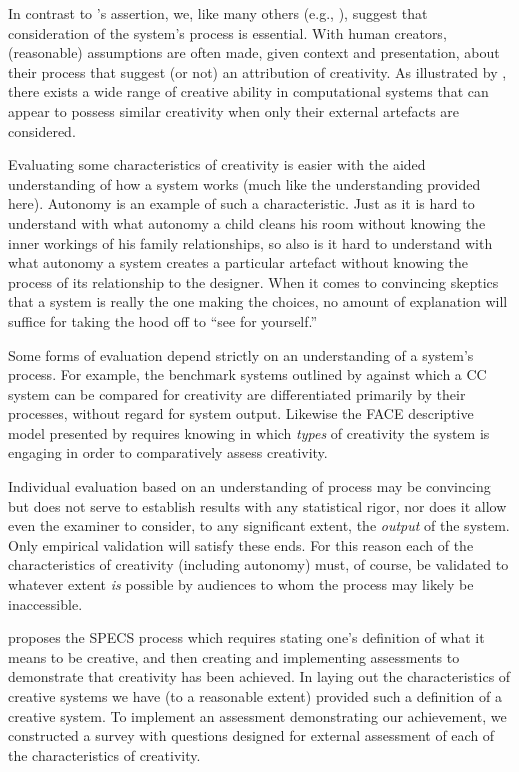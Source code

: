 \documentclass[phd,electronic,oneside,twosidetoc,letterpaper,chaptercenter,parttop,lol,lof,lot]{byumsphd}
\begin{document}
In contrast to \citeauthor{Ritchie2007}'s assertion, we, like many others (e.g., \cite{kasof1995explaining, Boden2003TheEdition, Colton2008CreativitySystems}), suggest that consideration of the system's process is essential. With human creators, (reasonable) assumptions are often made, given context and presentation, about their process that suggest (or not) an attribution of creativity. As illustrated by \cite{Ventura2016}, there exists a wide range of creative ability in computational systems that can appear to possess similar creativity when only their external artefacts are considered.

Evaluating some characteristics of creativity is easier with the aided understanding of how a system works (much like the understanding provided here). Autonomy is an example of such a characteristic. Just as it is hard to understand with what autonomy a child cleans his room without knowing the inner workings of his family relationships, so also is it hard to understand with what autonomy a system creates a particular artefact without knowing the process of its relationship to the designer. When it comes to convincing skeptics that a system is really the one making the choices, no amount of explanation will suffice for taking the hood off to ``see for yourself.'' 

Some forms of evaluation depend strictly on an understanding of a system's process. For example, the benchmark systems outlined by \cite{Ventura2016} against which a CC system can be compared for creativity are differentiated primarily by their processes, without regard for system output. Likewise the FACE descriptive model presented by \cite{Colton2011} requires knowing in which \textit{types} of creativity the system is engaging in order to comparatively assess creativity. 

Individual evaluation based on an understanding of process may be convincing but does not serve to establish results with any statistical rigor, nor does it allow even the examiner to consider, to any significant extent, the \textit{output} of the system. Only empirical validation will satisfy these ends. For this reason each of the characteristics of creativity (including autonomy) must, of course, be validated to whatever extent \textit{is} possible by audiences to whom the process may likely be inaccessible.

\cite{Jordanous2012ACreative} proposes the SPECS process which requires stating one's definition of what it means to be creative, and then creating and implementing assessments to demonstrate that creativity has been achieved. In laying out the characteristics of creative systems we have (to a reasonable extent) provided such a definition of a creative system. To implement an assessment demonstrating our achievement, we constructed a survey with questions designed for external assessment of each of the characteristics of creativity. 
\end{document}
